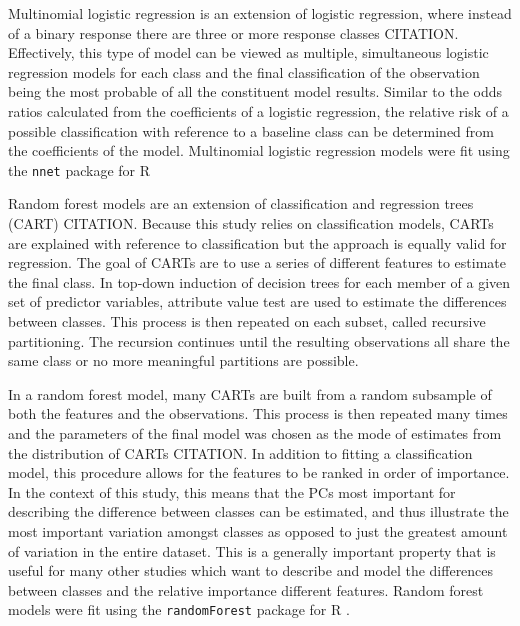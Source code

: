\documentclass[12pt,letterpaper]{article}\usepackage{graphicx, color}
\begin{document}
Multinomial logistic regression is an extension of logistic regression, where instead of a binary response there are three or more response classes CITATION. Effectively, this type of model can be viewed as multiple, simultaneous logistic regression models for each class and the final classification of the observation being the most probable of all the constituent model results. Similar to the odds ratios calculated from the coefficients of a logistic regression, the relative risk of a possible classification with reference to a baseline class can be determined from the coefficients of the model. Multinomial logistic regression models were fit using the \texttt{nnet} package for R \citep{Venables2002}

Random forest models are an extension of classification and regression trees (CART) CITATION. Because this study relies on classification models, CARTs are explained with reference to classification but the approach is equally valid for regression. The goal of CARTs are to use a series of different features to estimate the final class. In top-down induction of decision trees for each member of a given set of predictor variables, attribute value test are used to estimate the differences between classes. This process is then repeated on each subset, called recursive partitioning. The recursion continues until the resulting observations all share the same class or no more meaningful partitions are possible.

In a random forest model, many CARTs are built from a random subsample of both the features and the observations. This process is then repeated many times and the parameters of the final model was chosen as the mode of estimates from the distribution of CARTs CITATION. In addition to fitting a classification model, this procedure allows for the features to be ranked in order of importance. In the context of this study, this means that the PCs most important for describing the difference between classes can be estimated, and thus illustrate the most important variation amongst classes as opposed to just the greatest amount of variation in the entire dataset. This is a generally important property that is useful for many other studies which want to describe and model the differences between classes and the relative importance different features. Random forest models were fit using the \texttt{randomForest} package for R \citep{Liaw2002}.
\end{document}
